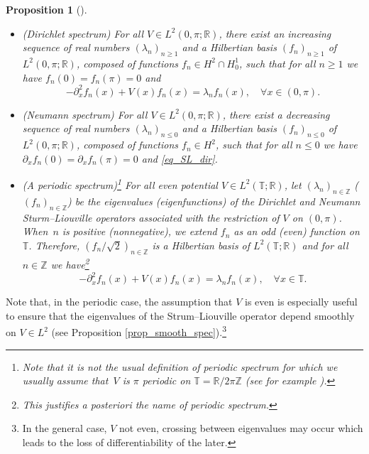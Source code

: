 \documentclass[JEP,XML,SOM,Unicode,NoEqCountersInSection,published]{cedram}
\newtheorem{proposition}[theorem]{Proposition}
\theoremstyle{definition}
\begin{document}
\skpt
\begin{proposition}[{\cite[Th.\,7, p.\,43]{PT}}]\label{prop_def_SL}
\begin{itemize}
\item
(Dirichlet spectrum) For all $V\in L^2(0,\pi;\mathbb{R})$, there exist an increasing sequence of real numbers $(\lambda_n)_{n\geq 1}$ and a Hilbertian basis $(f_n)_{n\geq 1}$ of $L^2(0,\pi;\mathbb{R})$, composed of functions $f_n \in H^2 \cap H^1_0$, such that for all $n\geq 1$ we have $f_n(0) = f_n(\pi) = 0$ and
\begin{equation}
\label{eq_SL_dir}
-\partial_x^2 f_n(x) + V(x) f_n(x) = \lambda_n f_n(x), \quad \forall x\in (0,\pi).
\end{equation}

\item
(Neumann spectrum) For all $V\in L^2(0,\pi;\mathbb{R})$, there exist a decreasing sequence of real numbers $(\lambda_n)_{n \leq 0}$ and a Hilbertian basis $(f_n)_{n\leq 0}$ of $L^2(0,\pi;\mathbb{R})$, composed of functions $f_n \in H^2$, such that for all $n\leq 0$ we have $\partial_x f_n(0) = \partial_x f_n(\pi) = 0$ and \eqref{eq_SL_dir}.

\item
(A periodic spectrum)\footnote{Note that it is not the usual definition of periodic spectrum for which we usually assume that~$V$ is $\pi$ periodic on $\mathbb{T}=\mathbb{R}/2\pi \mathbb{Z}$ (see for example \cite[App.\,B]{KP}).} For all even potential $V\in L^2(\mathbb{T};\mathbb{R})$, let $(\lambda_n)_{n\in \mathbb{Z}}$ (\resp $(f_n)_{n\in \mathbb{Z}}$) be the eigenvalues (\resp eigenfunctions) of the Dirichlet and Neumann Sturm--Liouville operators associated with the restriction of $V$ on $(0,\pi)$. When~$n$ is positive (\resp nonnegative), we extend $f_n$ as an odd (\resp even) function on $\mathbb{T}$. Therefore, $(f_n/\sqrt2)_{n\in \mathbb{Z}}$ is a Hilbertian basis of $L^2(\mathbb{T};\mathbb{R})$ and for all $n\in \mathbb{Z}$ we have\footnote{This justifies a posteriori the name of \emph{periodic spectrum}.}%
\begin{equation}
\label{eq_SL_per}
-\partial_x^2 f_n(x) + V(x) f_n(x) = \lambda_n f_n(x), \quad \forall x\in \mathbb{T}.
\end{equation}
\end{itemize}
\end{proposition}
Note that, in the periodic case, the assumption that $V$ is even is especially useful to ensure that the eigenvalues of the Strum--Liouville operator depend smoothly on $V\in L^2$ (see Proposition \ref{prop_smooth_spec}).\footnote{In the general case, \ie $V$ not even, crossing between eigenvalues may occur which leads to the loss of differentiability of the later.}
\end{document}
